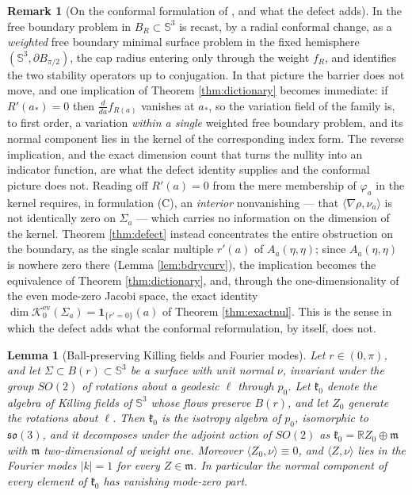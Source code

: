 \documentclass[11pt,a4paper]{amsart}
\theoremstyle{plain}
\newtheorem{lemma}[theorem]{Lemma}
\theoremstyle{definition}
\newtheorem{remark}[theorem]{Remark}
\newcommand{\R}{\mathbb{R}}
\newcommand{\Sph}{\mathbb{S}}
\newcommand{\Ker}{\mathcal{K}}
\begin{document}
\begin{remark}[On the conformal formulation of \cite{NZ1}, and what the defect adds]\label{rem:conformal}
In \cite[\S 2.5]{NZ1} the free boundary problem in $B_R\subset\Sph^3$ is recast, by a radial conformal change, as a \emph{weighted} free boundary minimal surface problem in the fixed hemisphere $(\Sph^3,\partial B_{\pi/2})$, the cap radius entering only through the weight $f_R$, and \cite[Lem. 2.6]{NZ1} identifies the two stability operators up to conjugation. In that picture the barrier does not move, and one implication of Theorem \ref{thm:dictionary} becomes immediate: if $R'(a_*)=0$ then $\tfrac{d}{da}f_{R(a)}$ vanishes at $a_*$, so the variation field of the family is, to first order, a variation \emph{within a single} weighted free boundary problem, and its normal component lies in the kernel of the corresponding index form. 
The reverse implication, and the exact dimension count that turns the nullity into an indicator function, are what the defect identity supplies and the conformal picture does not. Reading off $R'(a)=0$ from the mere membership of $\varphi_a$ in the kernel requires, in formulation (C), an
\emph{interior} nonvanishing --- that $\langle\nabla\rho,\nu_a\rangle$ is not
identically zero on $\Sigma_a$ --- which carries no information on the dimension of the kernel. Theorem \ref{thm:defect} instead concentrates the
entire obstruction on the boundary, as the single scalar multiple $r'(a)$ of $A_a(\eta,\eta)$; since $A_a(\eta,\eta)$ is nowhere zero there (Lemma \ref{lem:bdrycurv}), the implication becomes the equivalence of Theorem \ref{thm:dictionary}, and, through the one-dimensionality of the even mode-zero Jacobi space, the exact identity $\dim\Ker_0^{\mathrm{ev}}(\Sigma_a)=\mathbf{1}_{\{r'=0\}}(a)$ of Theorem \ref{thm:exactnul}. This is the sense in which the defect adds what the conformal reformulation, by itself, does not.
\end{remark}

\begin{lemma}[Ball-preserving Killing fields and Fourier modes]\label{lem:equivariance}
Let $r\in(0,\pi)$, and let $\Sigma\subset B(r)\subset\Sph^3$ be a surface with unit normal $\nu$, invariant under the group $SO(2)$ of rotations about a geodesic $\ell$ through $p_0$. Let $\mathfrak{k}_0$ denote the algebra of Killing fields of $\Sph^3$ whose flows preserve $B(r)$, and let $Z_0$ generate the rotations about $\ell$. Then $\mathfrak{k}_0$ is the isotropy algebra of $p_0$, isomorphic to $\mathfrak{so}(3)$, and it decomposes under the adjoint action of $SO(2)$ as $\mathfrak{k}_0=\R Z_0\oplus\mathfrak{m}$ with $\mathfrak{m}$ two-dimensional of weight one. Moreover $\langle Z_0,\nu\rangle\equiv 0$, and $\langle Z,\nu\rangle$ lies in the Fourier modes $|k|=1$ for every $Z\in\mathfrak{m}$. In particular the normal component of every element of $\mathfrak{k}_0$ has vanishing mode-zero part.
\end{lemma}
\end{document}
